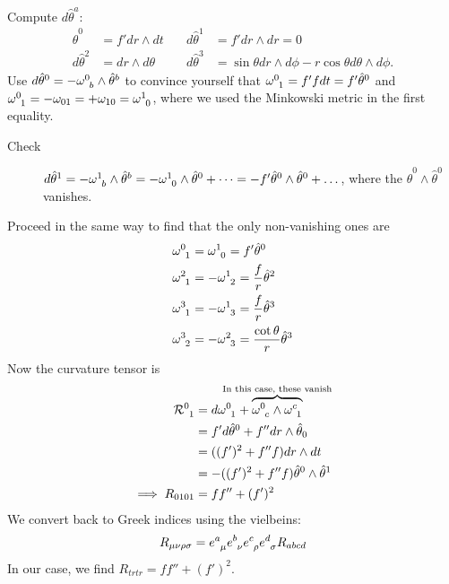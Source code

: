Compute $d\hat \theta^a$:
\begin{align}
  \hat \theta^0 &= f' dr \wedge dt \quad & d\hat\theta^1 &= f' dr \wedge dr = 0 \\
  d \hat\theta^2 &= dr \wedge d\theta \quad &d \hat\theta^3 &= \sin \theta dr \wedge d\phi - r \cos \theta d \theta \wedge d\phi.
\end{align}
Use $d \hat\theta^0 = - \omega \indices{^0_b} \wedge \hat\theta^b$ to convince yourself that $\omega \indices{^0_1} = f' f dt = f' \hat\theta^0$ and $\omega \indices{^0_1} = -\omega_{01} = + \omega_{10} = \omega \indices{^1_0}$, where we used the Minkowski metric in the first equality.
\begin{description}
  \item[Check] $d\hat\theta^1 = - \omega \indices{^1_b} \wedge \hat\theta^b = -\omega \indices{^1_0} \wedge \hat\theta^0 + \dots = -f' \hat\theta^0 \wedge \hat\theta^0 + \dots$, where the $\hat\theta^0 \wedge \hat\theta^0$ vanishes. \checkmark
\end{description}
Proceed in the same way to find that the only non-vanishing ones are
\begin{align}
  \omega \indices{^0_1} &= \omega \indices{^1_0} = f' \hat\theta^0 \\
  \omega \indices{^2_1}&= - \omega \indices{^1_2} = \frac{f}{r} \hat\theta^2 \\
  \omega \indices{^3_1} &= - \omega \indices{^1_3} = \frac{f}{r} \hat\theta^3 \\
  \omega \indices{^3_2} &= - \omega \indices{^2_3} = \frac{\cot \theta}{r} \hat\theta^3
\end{align}
Now the curvature tensor is
\begin{align}
  \mathcal{R} \indices{^0_1} &= d \omega \indices{^0_1} + \overbrace{\omega \indices{^0_c} \wedge \omega \indices{^c_1}}^{\mathclap{\text{In this case, these vanish}}} \\
			     &= f' d\hat\theta^0 + f'' dr \wedge \hat\theta_0 \\
			     &= ((f')^2 + f'' f) dr \wedge dt \\
			     &= -((f')^2 + f'' f) \hat\theta^0 \wedge \hat\theta^1 \\
  \implies R_{0101} &= ff'' + (f')^2
\end{align}
We convert back to Greek indices using the vielbeins:
\begin{equation}
  R_{\mu\nu\rho\sigma}= e \indices{^a_\mu} e \indices{^b_{\nu}} e \indices{^c_\rho} e \indices{^d_\sigma} R_{abcd}
\end{equation}
In our case, we find $R_{trtr} = ff'' + (f')^2$.
